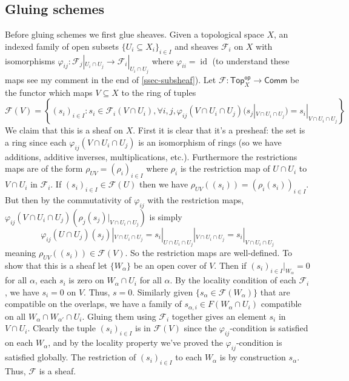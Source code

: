 \documentclass[12pt,letter]{article}
\newcommand{\id}[0]{\operatorname{id}}
\newcommand{\Top}[0]{\mathsf{Top}}
\newcommand{\op}[0]{\mathsf{op}}
\begin{document}
	\subsection{Gluing schemes}\label{ssec-gluing}
	Before gluing schemes we first glue sheaves. Given a topological space $X$, an indexed family of open subsets $\{U_i\subseteq X_i\}_{i\in I}$ and sheaves $\mathscr F_i$ on $X$ with isomorphisms $\varphi_{ij}:\mathscr F_j|_{U_i\cap U_j}\to \mathscr F_i|_{U_i\cap U_j}$ where $\varphi_{ii}=\id$ (to understand these maps see my comment in the end of \ref{ssec-subsheaf}). Let $\mathscr F:\Top_X^\op\to\mathsf{Comm}$ be the functor which maps $V\subseteq X$ to the ring of tuples
	\[\mathscr F(V)=\left\{(s_i)_{i\in I}:s_i\in \mathscr F_i(V\cap U_i),\forall i,j,\varphi_{ij}(V\cap U_i\cap U_j)(s_j|_{V\cap U_i\cap U_j})=s_i|_{V\cap U_i\cap U_j}\right\}\]
	We claim that this is a sheaf on $X$. First it is clear that it's a presheaf: the set is a ring since each $\varphi_{ij}(V\cap U_i\cap U_j)$ is an isomorphism of rings (so we have additions, additive inverses, multiplications, etc.). Furthermore the restrictions maps are of the form $\rho_{UV}=(\rho_i)_{i\in I}$ where $\rho_i$ is the restriction map of $U\cap U_i$ to $V\cap U_i$ in $\mathscr F_i$. If $(s_i)_{i\in I}\in \mathscr F(U)$ then we have $\rho_{UV}((s_i))=(\rho_i(s_i))_{i\in I}$. But then by the commutativity of $\varphi_{ij}$ with the restriction maps, $\varphi_{ij}(V\cap U_i\cap U_j)(\rho_j(s_j)|_{V\cap U_i\cap U_j})$ is simply 
	\[\varphi_{ij}(U\cap U_j)(s_j)|_{V\cap U_i\cap U_j}=s_i|_{U\cap U_i\cap U_j}|_{V\cap U_i\cap U_j}=s_i|_{V\cap U_i\cap U_j}\]
	meaning $\rho_{UV}((s_i))\in \mathscr F(V)$. So the restriction maps are well-defined. To show that this is a sheaf let $\{W_\alpha\}$ be an open cover of $V$. Then if $(s_i)_{i\in I}|_{W_\alpha}=0$ for all $\alpha$, each $s_i$ is zero on $W_\alpha\cap U_i$ for all $\alpha$. By the locality condition of each $\mathscr F_i$, we have $s_i=0$ on $V$. Thus, $s=0$. Similarly given $\{s_\alpha\in \mathscr F(W_\alpha)\}$ that are compatible on the overlaps, we have a family of $s_{\alpha, i}\in F(W_\alpha\cap U_i)$ compatible on all $W_\alpha\cap W_{\alpha'}\cap U_i$. Gluing them using $\mathscr F_i$ together gives an element $s_i$ in $V\cap U_i$. Clearly the tuple $(s_i)_{i\in I}$ is in $\mathscr F(V)$ since the $\varphi_{ij}$-condition is satisfied on each $W_\alpha$, and by the locality property we've proved the $\varphi_{ij}$-condition is satisfied globally. The restriction of $(s_i)_{i\in I}$ to each $W_\alpha$ is by construction $s_{\alpha}$. Thus, $\mathscr F$ is a sheaf.
	
\end{document}
